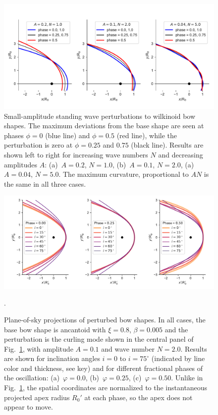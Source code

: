 \documentclass[useAMS, usenatbib, a4paper]{mnras}
\begin{document}
\begin{figure}
  \centering
  \includegraphics[width=\linewidth]{figs/compare_xyprime_wave-wilkinoid}
  \caption{Small-amplitude standing wave perturbations to wilkinoid
    bow shapes.  The maximum deviations from the base shape are seen
    at phases \(\phi = 0\) (blue line) and \(\phi = 0.5\) (red line), while
    the perturbation is zero at \(\phi = 0.25\) and \(0.75\) (black
    line).  Results are shown left to right for increasing wave
    numbers \(N\) and decreasing amplitudes \(A\): (a)~\(A = 0.2\),
    \(N = 1.0\), (b)~\(A = 0.1\), \(N = 2.0\), (a)~\(A = 0.04\),
    \(N = 5.0\).  The maximum curvature, proportional to \(A N\) is
    the same in all three cases.}
  \label{fig:perturb-shapes}
\end{figure}
\begin{figure}
  \centering
  \includegraphics[width=\linewidth]
  {figs/wave_xyprime-A010-N20-ancantoid-xi080-beta000500}
  \caption{Plane-of-sky projections of perturbed bow shapes.  In all
    cases, the base bow shape is ancantoid with \(\xi = 0.8\),
    \(\beta = 0.005\) and the perturbation is the curling mode shown in
    the central panel of Fig.~\ref{fig:perturb-shapes}, with amplitude
    \(A = 0.1\) and wave number \(N = 2.0\). Results are shown for
    inclination angles \(i = 0\) to \(i = 75^\circ\) (indicated by line
    color and thickness, see key) and for different fractional phases
    of the oscillation: (a)~\(\varphi = 0.0\), (b)~\(\varphi = 0.25\),
    (c)~\(\varphi = 0.50\). Unlike in Fig.~\ref{fig:perturb-shapes}, the
    spatial coordinates are normalized to the instantaneous projected
    apex radius \(R_0'\) at each phase, so the apex does not appear to
    move.}.
  \label{fig:perturb-xy-prime}
\end{figure}
\end{document}
